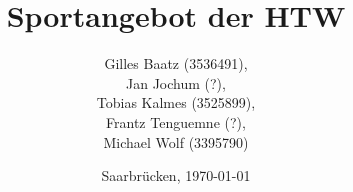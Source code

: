 \begin{titlepage}

	\titlehead
	{
		\hfill
		\texttt{[image: images/logos/HTW.png]}
		\hfill
	}
	
	\subject
	{
		\Huge Dokumentation\\
		\normalsize Semantische Interoperabilit\"at\\
	}
	
	\title
	{
		Sportangebot der HTW
	}
	
	\author
	{		
		Gilles Baatz (3536491),\\
		Jan Jochum (?),\\
		Tobias Kalmes (3525899),\\
		Frantz Tenguemne (?),\\
		Michael Wolf (3395790)		
	}
	
	\date
	{
		\normalsize{Saarbrücken, \today}
	}	
	\maketitle	
\end{titlepage}